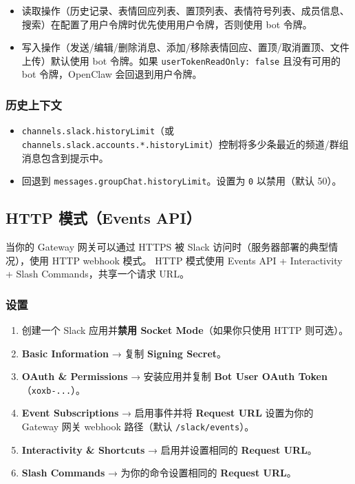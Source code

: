 \begin{itemize}
  \item 读取操作（历史记录、表情回应列表、置顶列表、表情符号列表、成员信息、搜索）在配置了用户令牌时优先使用用户令牌，否则使用 bot 令牌。
  \item 写入操作（发送/编辑/删除消息、添加/移除表情回应、置顶/取消置顶、文件上传）默认使用 bot 令牌。如果 \texttt{userTokenReadOnly: false} 且没有可用的 bot 令牌，OpenClaw 会回退到用户令牌。
\end{itemize}


\subsubsection{历史上下文}


\begin{itemize}
  \item \texttt{channels.slack.historyLimit}（或 \texttt{channels.slack.accounts.*.historyLimit}）控制将多少条最近的频道/群组消息包含到提示中。
  \item 回退到 \texttt{messages.groupChat.historyLimit}。设置为 \texttt{0} 以禁用（默认 50）。
\end{itemize}


\subsection{HTTP 模式（Events API）}


当你的 Gateway 网关可以通过 HTTPS 被 Slack 访问时（服务器部署的典型情况），使用 HTTP webhook 模式。
HTTP 模式使用 Events API + Interactivity + Slash Commands，共享一个请求 URL。

\subsubsection{设置}


\begin{enumerate}
  \item 创建一个 Slack 应用并\textbf{禁用 Socket Mode}（如果你只使用 HTTP 则可选）。
  \item \textbf{Basic Information} → 复制 \textbf{Signing Secret}。
  \item \textbf{OAuth \& Permissions} → 安装应用并复制 \textbf{Bot User OAuth Token}（\texttt{xoxb-...}）。
  \item \textbf{Event Subscriptions} → 启用事件并将 \textbf{Request URL} 设置为你的 Gateway 网关 webhook 路径（默认 \texttt{/slack/events}）。
  \item \textbf{Interactivity \& Shortcuts} → 启用并设置相同的 \textbf{Request URL}。
  \item \textbf{Slash Commands} → 为你的命令设置相同的 \textbf{Request URL}。
\end{enumerate}


